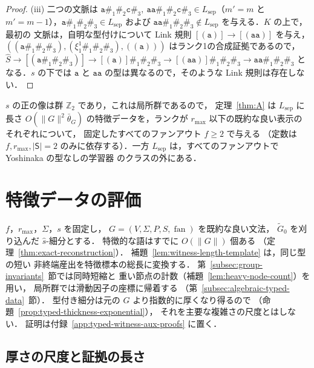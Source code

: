 \documentclass[11pt,a4paper]{ltjsarticle}
\numberwithin{equation}{section}
\theoremstyle{plain}
\theoremstyle{definition}
\theoremstyle{remark}
\newcommand{\fan}{\operatorname{fan}}
\theoremstyle{plain}
\begin{document}
\begin{proof}
(iii) 二つの文脈は
$\mathtt a\mathtt\#_1\mathtt\#_2\mathtt c\mathtt\#_3,\
\mathtt a\mathtt a\mathtt\#_1\mathtt\#_2\mathtt c\mathtt\#_3\in L_{\mathrm{sep}}$（$m'=m$ と
$m'=m-1$），$\mathtt a\mathtt\#_1\mathtt\#_2\mathtt\#_3\in L_{\mathrm{sep}}$ および
$\mathtt a\mathtt a\mathtt\#_1\mathtt\#_2\mathtt\#_3\notin L_{\mathrm{sep}}$ を与える．$K$ の上で，最初の
文脈は，自明な型付けについて Link 規則 $[(\mathtt a)]\to[(\mathtt a\mathtt a)]$ を与え，
$((\mathtt a\mathtt\#_1\mathtt\#_2\mathtt\#_3),(\xi_1^1\mathtt\#_1\mathtt\#_2\mathtt\#_3),
((\mathtt a)))$ はランク1の合成証拠であるので，
$\widehat S\to[(\mathtt a\mathtt\#_1\mathtt\#_2\mathtt\#_3)]\to[(\mathtt a)]\mathtt\#_1\mathtt\#_2
\mathtt\#_3\to[(\mathtt a\mathtt a)]\mathtt\#_1\mathtt\#_2\mathtt\#_3\to
\mathtt a\mathtt a\mathtt\#_1\mathtt\#_2\mathtt\#_3$ となる．$s$ の下では $\mathtt a$ と
$\mathtt a\mathtt a$ の型は異なるので，そのような Link 規則は存在しない．
\end{proof}

$s$ の正の像は群 $\mathbb Z_2$ であり，これは局所群であるので，
定理~\ref{thm:A} は $L_{\mathrm{sep}}$ に長さ
$O(\|G\|^2\bar\theta_G)$ の特徴データを，ランクが $r_{\max}$ 以下の既約な良い表示のそれぞれについて，
固定したすべてのファンアウト $f\ge2$ で与える
（定数は $f,r_{\max},|\mathsf S|=2$ のみに依存する）．一方 $L_{\mathrm{sep}}$ は，すべてのファンアウトで Yoshinaka の型なしの学習器
\cite{Yoshinaka2011} のクラスの外にある．

\section{特徴データの評価}
\label{sec:char-data}
$f$，$r_{\max}$，$\Sigma$，$s$ を固定し，
$G=(V,\Sigma,P,S,\fan)$ を既約な良い文法，
$\widetilde G_0$ を刈り込んだ $\widehat s$-細分とする．
特徴的な語はすでに $O(\|G\|)$ 個ある
（定理~\ref{thm:exact-reconstruction}）．
補題~\ref{lem:witness-length-template} は，同じ型の短い
非終端産出を特徴標本の総長に変換する．
第~\ref{subsec:group-invariants}~節では同時短縮と
重い節点の計数（補題~\ref{lem:heavy-node-count}）を用い，
局所群では滑動因子の座標に帰着する
（第~\ref{subsec:algebraic-typed-data}~節）．
型付き細分は元の $G$ より指数的に厚くなり得るので
（命題~\ref{prop:typed-thickness-exponential}），
それを主要な複雑さの尺度とはしない．
証明は付録~\ref{app:typed-witness-aux-proofs} に置く．

\subsection{厚さの尺度と証拠の長さ}
\label{subsec:thickness-contexts}
\end{document}

